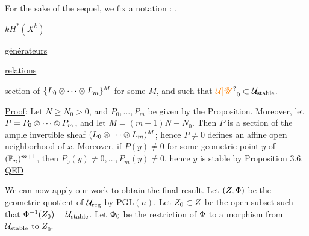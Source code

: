 For the sake of the sequel, we fix a  notation :
.

\textcircled{$k$}\qquad $H^*(X^k)$\qquad{}

\uline{générateurs}


\uline{relations}

section of $\{L_0\otimes\cdots\otimes L_m\}^M$ for some $M$, and such that $\handwritten{\unsure{\mathcal{U}|\mathscr{U}}}_0\handwritten{\subset\mathcal{U}}_{\handwritten{\mathrm{stable}}}$.

\uline{Proof}: Let $N\geq N_0>0$, and $P_0,\ldots,P_m$ be given by the
Proposition. Moreover, let $P=P_0\otimes\cdots\otimes P_m$, and let $M=(m+1)N-N_0$.
Then $P$ is a section of the ample invertible sheaf $(L_0\otimes\cdots\otimes L_m)^M$;
hence $P\ne0$ defines an affine open neighborhood of $x$. Moreover,
if $P(y)\ne0$ for some geometric point $y$ of $(\mathbb{P}_n)^{m+1}$, then
$P_0(y)\ne0,\ldots,P_m(y)\ne0$, hence $y$ is stable by Proposition 3.6.
\hfill\uline{QED}

We can now apply our work to obtain the final result. Let $(Z,\Phi)$
be the geometric quotient of $\mathcal{U}_{\mathrm{reg}}$ by $\mathrm{PGL}(n)$. Let $Z_0\subset Z$ be
the open subset such that $\Phi^{-1}(Z_0)=\mathcal{U}_{\mathrm{stable}}$. Let $\Phi_0$ be the
restriction of $\Phi$ to a morphism from $\mathcal{U}_{\mathrm{stable}}$ to $Z_0$.

